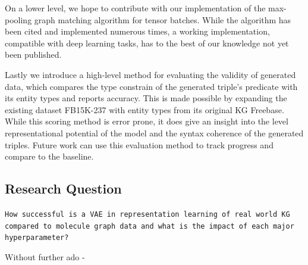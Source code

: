 On a lower level, we hope to contribute with our implementation of the max-pooling graph matching algorithm for tensor batches. While the algorithm has been cited and implemented numerous times, a working implementation, compatible with deep learning tasks, has to the best of our knowledge not yet been published.  

Lastly we introduce a high-level method for evaluating the validity of generated data, which compares the type constrain of the generated triple's predicate with its entity types and reports accuracy. This is made possible by expanding the existing dataset FB15K-237 with entity types from its original KG Freebase. While this scoring method is error prone, it does give an insight into the level representational potential of the model and the syntax coherence of the generated triples. Future work can use this evaluation method to track progress and compare to the baseline. 



\subsection{Research Question}

\begin{center}
    \texttt{How successful is a VAE in representation learning of real world KG compared to molecule graph data and what is the impact of each major hyperparameter?}
    \label{sec1:requestion}
\end{center}


Without further ado -
